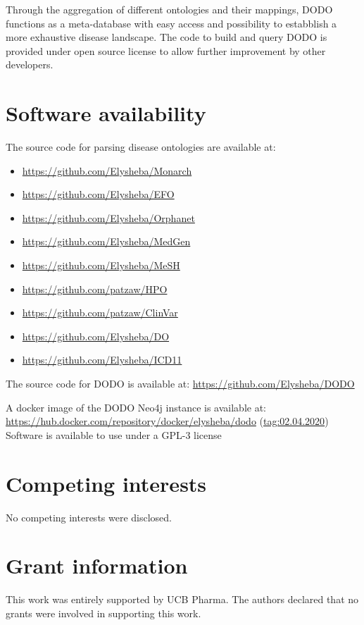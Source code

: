 \documentclass[9pt,a4paper,]{extarticle}
\begin{document}
Through the aggregation of different ontologies and their mappings, DODO functions as a meta-database with easy access and possibility to estabblish a more exhaustive disease landscape. The code to build and query DODO is provided under open source license to allow further improvement by other developers.

\hypertarget{software-availability}{%
\section{Software availability}\label{software-availability}}

The source code for parsing disease ontologies are available at:

\begin{itemize}
\item
  \url{https://github.com/Elysheba/Monarch}
\item
  \url{https://github.com/Elysheba/EFO}
\item
  \url{https://github.com/Elysheba/Orphanet}
\item
  \url{https://github.com/Elysheba/MedGen}
\item
  \url{https://github.com/Elysheba/MeSH}
\item
  \url{https://github.com/patzaw/HPO}
\item
  \url{https://github.com/patzaw/ClinVar}
\item
  \url{https://github.com/Elysheba/DO}
\item
  \url{https://github.com/Elysheba/ICD11}
\end{itemize}

The source code for DODO is available at:
\url{https://github.com/Elysheba/DODO}

A docker image of the DODO Neo4j instance is available at:
\url{https://hub.docker.com/repository/docker/elysheba/dodo} (\url{tag:02.04.2020})
Software is available to use under a GPL-3 license

\hypertarget{competing-interests}{%
\section{Competing interests}\label{competing-interests}}

No competing interests were disclosed.

\hypertarget{grant-information}{%
\section{Grant information}\label{grant-information}}

This work was entirely supported by UCB Pharma.
The authors declared that no grants were involved in supporting this work.


\end{document}
